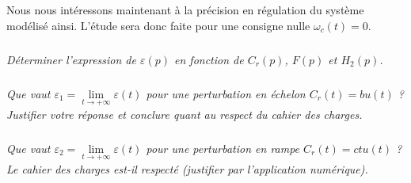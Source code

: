 \documentclass[10pt,fleqn]{article} %
\begin{document}
\begin{multicols}{2}
Nous nous intéressons maintenant à la précision en régulation du système modélisé ainsi. L'étude sera donc faite pour une consigne nulle $\omega_c(t) = 0$.

\subparagraph{}
\textit{Déterminer l'expression de $\varepsilon(p)$ en fonction de $C_r(p)$, $F(p)$ et $H_2(p)$.}

\subparagraph{}
\textit{Que vaut $\varepsilon_1 = \lim\limits_{t \to + \infty} \varepsilon(t)$ pour une perturbation en échelon $C_r(t)=bu(t)$ ? Justifier votre réponse et conclure quant au respect du cahier des charges.}

\subparagraph{}
\textit{Que vaut $\varepsilon_2 = \lim\limits_{t \to + \infty} \varepsilon(t)$ pour une perturbation en rampe $C_r(t)=c t u(t)$ ? Le cahier des charges est-il respecté (justifier par l'application numérique).}


\end{multicols}
\end{document}
